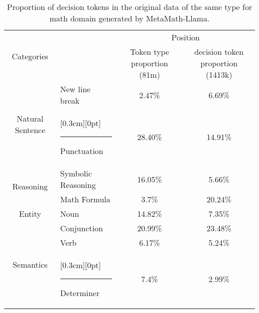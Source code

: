 \begin{table*}[htbp]
   
  \caption{Proportion of decision tokens in the original data of the same type for math domain generated by MetaMath-Llama.}
    \noindent 
    \begin{minipage}{\textwidth}
    
   
   \setlength{\abovecaptionskip}{7pt}
   
   \vspace{-0.05in}
   
   \setlength{\cmidrulewidth}{0.01em}
   \renewcommand{\tabcolsep}{10pt}
   \renewcommand{\arraystretch}{1.2}
   \centering
   
    \begin{tabular}{cl|cc}
   
   \toprule
        \multirow{2}{*}{Categories} & \hspace{2.0em}\multirow{2}{*}{Subtypes} & \multicolumn{2}{c}{Position}\\
        \cmidrule[\cmidrulewidth](lr){3-4}
          && Token type proportion (81m) & decision token proportion (1413k)\\
         \midrule
         \multirow{2}{*}{Natural Sentence} &
          \vline \hspace{0.7em} New line break  & 2.47\% & 6.69\% \\
         & \raisebox{0pt}[0.3cm][0pt]{\rule{0.5pt}{1cm}}\hspace{1.4em} Punctuation  &  28.40\% & 14.91\% \\

         
         \multirow{2}{*}{Reasoning} & \vline \hspace{0.1em} Symbolic Reasoning & 16.05\% & 5.66\% \\

         & \vline \hspace{0.8em} Math Formula &   3.7\% & 20.24\% \\
        
        
         \multirow{1}{*}{Entity}&  \hspace{2.7em} Noun &  14.82\% & 7.35\% \\

        
         \multirow{3}{*}{Semantics}& \vline \hspace{1.4em} Conjunction &  20.99\% & 23.48\% \\
         & \vline \hspace{2.8em} Verb &  6.17\% & 5.24\% \\
         & \raisebox{0pt}[0.3cm][0pt]{\rule{0.5pt}{1cm}} \hspace{1.5em} Determiner &  7.4\% & 2.99\% \\
         
         
         \bottomrule
   \end{tabular}

  \label{tab:Math_Llama_confused_proportion}
    \end{minipage}
\end{table*}



